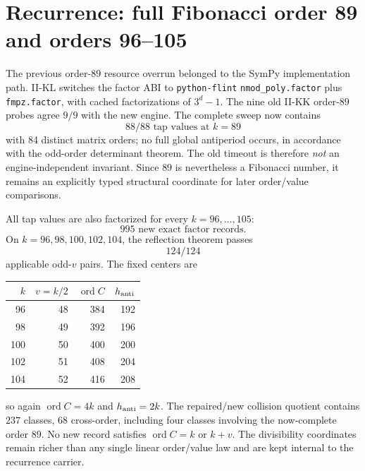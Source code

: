 \documentclass[10pt,a4paper]{article}
\begin{document}
\section{Recurrence: full Fibonacci order 89 and orders 96--105}
The previous order-$89$ resource overrun belonged to the SymPy implementation path.  II-KL switches the factor ABI to \texttt{python-flint} \texttt{nmod\_poly.factor} plus \texttt{fmpz.factor}, with cached factorizations of $3^d-1$.  The nine old II-KK order-$89$ probes agree $9/9$ with the new engine.  The complete sweep now contains
\[
\boxed{88/88\text{ tap values at }k=89}
\]
with 84 distinct matrix orders; no full global antiperiod occurs, in accordance with the odd-order determinant theorem.  The old timeout is therefore \emph{not} an engine-independent invariant.  Since $89$ is nevertheless a Fibonacci number, it remains an explicitly typed structural coordinate for later order/value comparisons.

All tap values are also factorized for every $k=96,\ldots,105$:
\[
\boxed{995\text{ new exact factor records}.}
\]
On $k=96,98,100,102,104$, the reflection theorem passes
\[
\boxed{124/124}
\]
applicable odd-$v$ pairs.  The fixed centers are
\begin{center}\begin{tabular}{rrrr}\toprule $k$&$v=k/2$&$\operatorname{ord}C$&$h_{\rm anti}$\\\midrule
96 & 48 & 384 & 192\\
98 & 49 & 392 & 196\\
100 & 50 & 400 & 200\\
102 & 51 & 408 & 204\\
104 & 52 & 416 & 208\\\bottomrule\end{tabular}\end{center}
so again $\operatorname{ord}C=4k$ and $h_{\rm anti}=2k$.  The repaired/new collision quotient contains $237$ classes, $68$ cross-order, including four classes involving the now-complete order $89$.  No new record satisfies $\operatorname{ord}C=k$ or $k+v$.  The divisibility coordinates remain richer than any single linear order/value law and are kept internal to the recurrence carrier.
\end{document}
